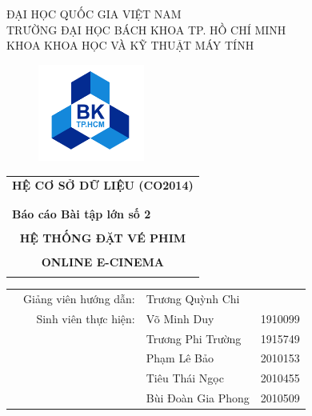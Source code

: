 \documentclass{article}
\begin{document}
\begin{titlepage}
\begin{center}
    \large ĐẠI HỌC QUỐC GIA VIỆT NAM \\
    TRƯỜNG ĐẠI HỌC BÁCH KHOA TP. HỒ CHÍ MINH \\
    KHOA KHOA HỌC VÀ KỸ THUẬT MÁY TÍNH
\end{center}

\vspace{1.5cm}

\begin{figure}[!ht]
    \centering \includegraphics[width=3.5cm]{hcmut.png}
\end{figure}

\vspace{1.5cm}

\begin{table}[H]
    \centering
    \begin{tabular}{c}
    {\bf \Large HỆ CƠ SỞ DỮ LIỆU (CO2014)}    \\  \\
    \hline  \\
    \multicolumn{1}{l}{{\bf \large Báo cáo Bài tập lớn số 2}}    \\  \\
    {\bf \huge HỆ THỐNG ĐẶT VÉ PHIM}     \\  \\
    {\bf \huge ONLINE E-CINEMA} \\ \\
    \hline
    \end{tabular}
\end{table}

\vspace{1.5cm}

\begin{table}[H]
\centering
\begin{tabular}{lrlc}
\hspace{5.5 cm} & Giảng viên hướng dẫn: & Trương Quỳnh Chi    &          \\
                & Sinh viên thực hiện: & Võ Minh Duy   & 1910099  \\ 
                &                       &Trương Phi Trường     & 1915749   \\
                &                       & Phạm Lê Bảo & 2010153 \\
                &                       & Tiêu Thái Ngọc  & 2010455  \\
                &                       & Bùi Đoàn Gia Phong & 2010509  


\end{tabular}
\end{table}
\end{titlepage}
\end{document}
